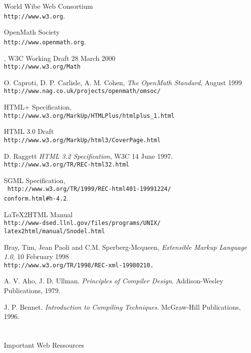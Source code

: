 \begin{thebibliography}{99}

 World Wibe Web Consortium
\\
{\tt http://www.w3.org}.

 OpenMath Society
\\
{\tt http://www.openmath.org}.

, W3C Working Draft 28 March 2000\\
{\tt http://www.w3.org/Math}

 O. Caproti, D. P. Carlisle, A. M. Cohen, {\it The OpenMath Standard}, August 1999
\\
{\tt http://www.nag.co.uk/projects/openmath/omsoc/}

 HTML+ Specification,
\\
{\tt http://www.w3.org/MarkUp/HTMLPlus/htmlplus\_1.html}

 HTML 3.0 Draft
\\
{\tt http://www.w3.org/MarkUp/html3/CoverPage.html}

 D. Raggett {\it HTML 3.2 Specification}, W3C 14 June 1997.
\\
{\tt http://www.w3.org/TR/REC-html32.html}

 SGML Specification,
\\
{\tt
http://www.w3.org/TR/1999/REC-html401-19991224/ \\
 \hspace{1cm} conform.html\#h-4.2}.

 \LaTeX2HTML Manual
\\
{\tt http://www-dsed.llnl.gov/files/programs/UNIX/ \\ latex2html/manual/Snodel.html}

 Bray, Tim, Jean Paoli and C.M. Sperberg-Mcqueen, {\it Extensible Markup Language 1.0}, 10 February 1998 \\ 
{\tt http://www.w3.org/TR/1998/REC-xml-19980210.  }

 A. V. Aho, J. D. Ullman. {\it Principles of Compiler Design}. Addison-Wesley Publications, 1979.

 J. P. Bennet. {\it Introduction to Compiling Techniques}. McGraw-Hill Publications, 1996.
\\
\\
\\
{\Large Important Web Ressources}


\end{thebibliography}
